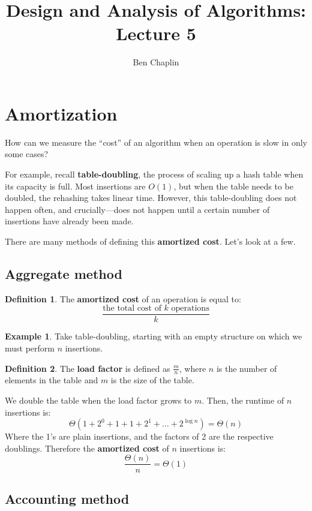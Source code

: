 \documentclass[11pt]{article}
\title{Design and Analysis of Algorithms: Lecture 5}
\author{Ben Chaplin}
\date{}
\theoremstyle{plain}
\theoremstyle{definition}
\newtheorem*{defn}{Definition}
\newtheorem*{ex}{Example}
\begin{document}
\maketitle
\tableofcontents

\section{Amortization}

How can we measure the ``cost'' of an algorithm when an operation is slow in only some cases?

For example, recall \textbf{table-doubling}, the process of scaling up a hash table when its 
capacity is full. Most insertions are $O(1)$, but when the table needs to be doubled, the rehashing
takes linear time. However, this table-doubling does not happen often, and crucially---does not 
happen until a certain number of insertions have already been made. 

There are many methods of defining this \textbf{amortized cost}. Let's look at a few.

\subsection{Aggregate method}

\begin{defn}
    The \textbf{amortized cost} of an operation is equal to:
    $$\frac{\text{the total cost of $k$ operations}}{k}$$
\end{defn}

\begin{ex}
    Take table-doubling, starting with an empty structure on which we must perform $n$ insertions.
    \begin{defn}
        The \textbf{load factor} is defined as $\frac{m}{n}$, where $n$ is the number of elements
        in the table and $m$ is the size of the table.
    \end{defn}
    We double the table when the load factor grows to $m$. Then, the runtime of $n$ insertions is:
    $$\Theta(1 + 2^0 + 1 + 1 + 2^1 + \ldots + 2^{\log n}) = \Theta(n)$$
    Where the 1's are plain insertions, and the factors of 2 are the respective doublings.
    Therefore the \textbf{amortized cost} of $n$ insertions is:
    $$\frac{\Theta(n)}{n} = \Theta(1)$$
\end{ex}

\subsection{Accounting method}
\end{document}
